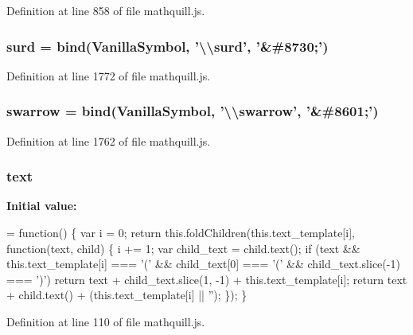 Definition at line 858 of file mathquill.\-js.

\subsubsection[{surd}]{ surd = {\bf bind}({\bf Vanilla\-Symbol}, '\textbackslash{}\textbackslash{}surd', '\&\#8730;')}\label{mathquill_8js_a9e8c5e91a4117435065f4985995d34d5}


Definition at line 1772 of file mathquill.\-js.

\subsubsection[{swarrow}]{ swarrow = {\bf bind}({\bf Vanilla\-Symbol}, '\textbackslash{}\textbackslash{}swarrow', '\&\#8601;')}\label{mathquill_8js_a3ea23fda85b55293bc6e2e8f7d9bbf31}


Definition at line 1762 of file mathquill.\-js.

\subsubsection[{text}]{\setlength{\rightskip}{0pt plus 5cm}{\bf \-\_\-} text}\label{mathquill_8js_afd670572c010bca545fd3952276dd249}
{\bfseries Initial value\-:}
\begin{DoxyCode}
= \textcolor{keyword}{function}() \{
  var i = 0;
  \textcolor{keywordflow}{return} this.foldChildren(this.text_template[i], \textcolor{keyword}{function}(text, child) \{
    i += 1;
    var child\_text = child.text();
    \textcolor{keywordflow}{if} (text && this.text_template[i] === \textcolor{charliteral}{'('}
        && child\_text[0] === \textcolor{charliteral}{'('} && child\_text.slice(-1) === \textcolor{charliteral}{')'})
      \textcolor{keywordflow}{return} text + child\_text.slice(1, -1) + this.text_template[i];
    \textcolor{keywordflow}{return} text + child.text() + (this.text_template[i] || \textcolor{stringliteral}{''});
  \});
\}
\end{DoxyCode}


Definition at line 110 of file mathquill.\-js.

